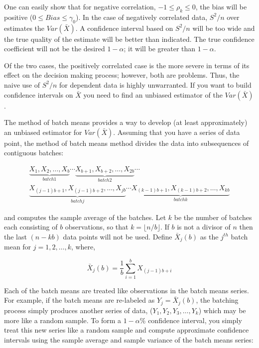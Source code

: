 \documentclass[
]{book}
\theoremstyle{definition}
\theoremstyle{definition}
\theoremstyle{definition}
\theoremstyle{definition}
\theoremstyle{remark}
\begin{document}
One can easily show that for negative correlation,
\(-1 \leq \rho_k \leq 0\), the bias will be positive
(\(0 \leq Bias \leq \gamma_0\)). In the case of negatively correlated
data, \(S^2/n\) over estimates the \(Var(\bar{X})\). A confidence interval
based on \(S^2/n\) will be too wide and the true quality of the estimate
will be better than indicated. The true confidence coefficient will not
be the desired \(1 - \alpha\); it will be greater than \(1 - \alpha\).

Of the two cases, the positively correlated case is the more severe in
terms of its effect on the decision making process; however, both are
problems. Thus, the naive use of \(S^2/n\) for dependent data is highly
unwarranted. If you want to build confidence intervals on \(\bar{X}\) you
need to find an unbiased estimator of the \(Var(\bar{X})\).

The method of batch means provides a way to develop (at least
approximately) an unbiased estimator for \(Var(\bar{X})\). Assuming that
you have a series of data point, the method of batch means method
divides the data into subsequences of contiguous batches:

\[\begin{gathered}
\underbrace{X_1, X_2, \ldots, X_b}_{batch 1} \cdots
\underbrace{X_{b+1}, X_{b+2}, \ldots, X_{2b}}_{batch 2} \cdots \\
\underbrace{X_{(j-1)b+1}, X_{(j-1)b+2}, \ldots, X_{jb}}_{batch j}  \cdots
\underbrace{X_{(k-1)b+1}, X_{(k-1)b+2}, \ldots, X_{kb}}_{batch k}\end{gathered}\]

and computes the sample average of the batches. Let \(k\) be the number of
batches each consisting of \(b\) observations, so that
\(k = \lfloor n/b \rfloor\). If \(b\) is not a divisor of \(n\) then the last
\((n - kb)\) data points will not be used. Define \(\bar{X}_j(b)\) as the
\(j^{th}\) batch mean for \(j = 1, 2, \ldots, k\), where,

\[\bar{X}_j(b) = \dfrac{1}{b} \sum_{i=1}^b X_{(j-1)b+i}\]

Each of the batch means are treated like observations in the batch means
series. For example, if the batch means are re-labeled as
\(Y_j = \bar{X}_j(b)\), the batching process simply produces another
series of data, (\(Y_1, Y_2, Y_3, \ldots, Y_k\)) which may be more like a
random sample. To form a \(1 - \alpha\)\% confidence interval, you simply
treat this new series like a random sample and compute approximate
confidence intervals using the sample average and sample variance of the
batch means series:
\end{document}
